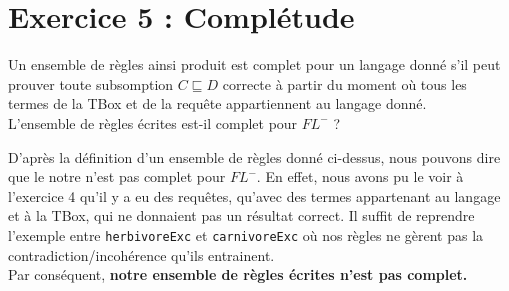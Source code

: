 \documentclass[a4paper,12pt]{report}
\begin{document}

\newpage
\section*{Exercice 5 : Complétude}

Un ensemble de règles ainsi produit est complet pour un langage donné s'il peut prouver toute subsomption \(C \sqsubseteq D\) correcte à partir
    du moment où tous les termes de la TBox et de la requête appartiennent au langage donné.\\

L'ensemble de règles écrites est-il complet pour \(FL^-\) ?



\begin{tcolorbox}[colback=gray!10, colframe=blue!30, coltitle=black, title=Réponse à l'exercice 5 - 1/1]

    D'après la définition d'un ensemble de règles donné ci-dessus, nous pouvons dire que le notre n'est pas complet pour \(FL^-\). En effet, nous avons pu le voir à 
        l'exercice 4 qu'il y a eu des requêtes, qu'avec des termes appartenant au langage et à la TBox, qui ne donnaient pas un résultat correct. Il suffit de reprendre
        l'exemple entre \texttt{herbivoreExc} et \texttt{carnivoreExc} où nos règles ne gèrent pas la contradiction/incohérence qu'ils entrainent.\\

    Par conséquent, \textbf{notre ensemble de règles écrites n'est pas complet.}

\end{tcolorbox}
\end{document}

